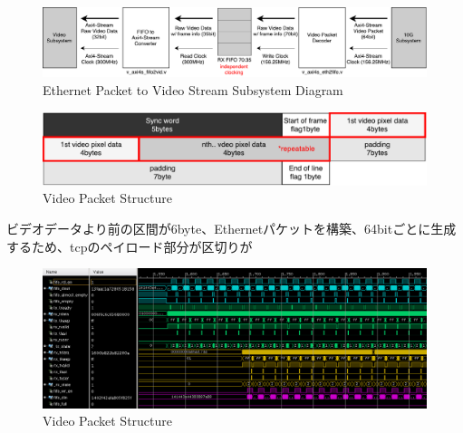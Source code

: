 \begin{figure}[htbp]
    \begin{center}
        \includegraphics[bb=0 0 911 166,width=15.5cm]{img/fpga-ethernet-video-diagram.pdf}
    \end{center}
    \caption{Ethernet Packet to Video Stream Subsystem Diagram}
    \label{fig:fpga-ethernet-video-diagram}
\end{figure}




\begin{figure}[htbp]
    \begin{center}
        \includegraphics[bb=0 0 643 122,width=15.5cm]{img/fpga-video-packet.pdf}
    \end{center}
    \caption{Video Packet Structure}
    \label{fig:fpga-video-packet}
\end{figure}

ビデオデータより前の区間が6byte、Ethernetパケットを構築、64bitごとに生成するため、tcpのペイロード部分が区切りが


\begin{figure}[htbp]
    \begin{center}
        \includegraphics[bb=0 0 1201 438,width=15.5cm]{img/fpga-ila-fifo-to-eth.png}
    \end{center}
    \caption{Video Packet Structure}
    \label{fig:fpga-ila-fifo-to-eth}
\end{figure}

